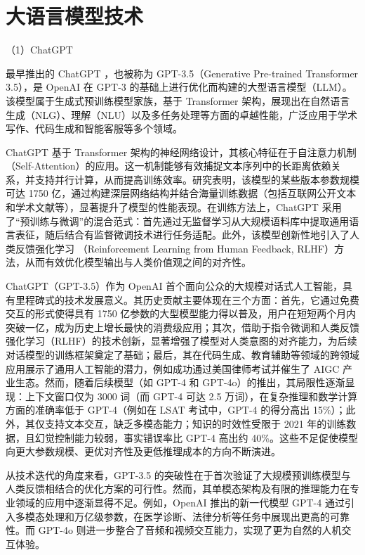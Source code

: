 \section{大语言模型技术}
\label{sec:rw-llm}

（1）ChatGPT
\label{sec:TOSWT-gen-chatgpt}

最早推出的 ChatGPT \cite{chatgpt}，也被称为 GPT-3.5（Generative Pre-trained Transformer 3.5），是 OpenAI 在 GPT-3 的基础上进行优化而构建的大型语言模型（LLM）。该模型属于生成式预训练模型家族，基于 Transformer 架构，展现出在自然语言生成（NLG）、理解（NLU）以及多任务处理等方面的卓越性能，广泛应用于学术写作、代码生成和智能客服等多个领域。

ChatGPT 基于 Transformer 架构的神经网络设计，其核心特征在于自注意力机制（Self-Attention）的应用。这一机制能够有效捕捉文本序列中的长距离依赖关系，并支持并行计算，从而提高训练效率。研究表明，该模型的某些版本参数规模可达 1750 亿，通过构建深层网络结构并结合海量训练数据（包括互联网公开文本和学术文献等），显著提升了模型的性能表现。在训练方法上，ChatGPT 采用了“预训练与微调”的混合范式：首先通过无监督学习从大规模语料库中提取通用语言表征，随后结合有监督微调技术进行任务适配。此外，该模型创新性地引入了人类反馈强化学习 \cite{kaufmann2024surveyreinforcementlearninghuman}（Reinforcement Learning from Human Feedback, RLHF）方法，从而有效优化模型输出与人类价值观之间的对齐性。

ChatGPT（GPT-3.5）作为 OpenAI 首个面向公众的大规模对话式人工智能，具有里程碑式的技术发展意义。其历史贡献主要体现在三个方面：首先，它通过免费交互的形式使得具有 1750 亿参数的大型模型能力得以普及，用户在短短两个月内突破一亿，成为历史上增长最快的消费级应用；其次，借助于指令微调和人类反馈强化学习（RLHF）的技术创新，显著增强了模型对人类意图的对齐能力，为后续对话模型的训练框架奠定了基础；最后，其在代码生成、教育辅助等领域的跨领域应用展示了通用人工智能的潜力，例如成功通过美国律师考试并催生了 AIGC 产业生态。然而，随着后续模型（如 GPT-4 和 GPT-4o）的推出，其局限性逐渐显现：上下文窗口仅为 3000 词（而 GPT-4 可达 2.5 万词），在复杂推理和数学计算方面的准确率低于 GPT-4（例如在 LSAT 考试中，GPT-4 的得分高出 15\%）；此外，其仅支持文本交互，缺乏多模态能力；知识的时效性受限于 2021 年的训练数据，且幻觉控制能力较弱，事实错误率比 GPT-4 高出约 40\%。这些不足促使模型向更大参数规模、更优对齐性及更低推理成本的方向不断演进。

从技术迭代的角度来看，GPT-3.5 的突破性在于首次验证了大规模预训练模型与人类反馈相结合的优化方案的可行性。然而，其单模态架构及有限的推理能力在专业领域的应用中逐渐显得不足。例如，OpenAI 推出的新一代模型 GPT-4 通过引入多模态处理和万亿级参数，在医学诊断、法律分析等任务中展现出更高的可靠性。而 GPT-4o 则进一步整合了音频和视频交互能力，实现了更为自然的人机交互体验。

